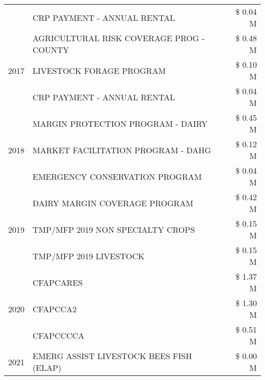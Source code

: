 \begin{tabular}{llr}
 & CRP PAYMENT - ANNUAL RENTAL & \$ 0.04 M \\
\cline{1-3}
\multirow[t]{3}{*}{2017} & AGRICULTURAL RISK COVERAGE PROG - COUNTY & \$ 0.48 M \\
 & LIVESTOCK FORAGE PROGRAM & \$ 0.10 M \\
 & CRP PAYMENT - ANNUAL RENTAL & \$ 0.04 M \\
\cline{1-3}
\multirow[t]{3}{*}{2018} & MARGIN PROTECTION PROGRAM - DAIRY & \$ 0.45 M \\
 & MARKET FACILITATION PROGRAM - DAHG & \$ 0.12 M \\
 & EMERGENCY CONSERVATION PROGRAM & \$ 0.04 M \\
\cline{1-3}
\multirow[t]{3}{*}{2019} & DAIRY MARGIN COVERAGE PROGRAM & \$ 0.42 M \\
 & TMP/MFP 2019 NON SPECIALTY CROPS & \$ 0.15 M \\
 & TMP/MFP 2019 LIVESTOCK & \$ 0.15 M \\
\cline{1-3}
\multirow[t]{3}{*}{2020} & CFAPCARES & \$ 1.37 M \\
 & CFAPCCA2 & \$ 1.30 M \\
 & CFAPCCCCA & \$ 0.51 M \\
\cline{1-3}
2021 & EMERG ASSIST LIVESTOCK BEES FISH (ELAP) & \$ 0.00 M \\
\cline{1-3}
\bottomrule
\end{tabular}

